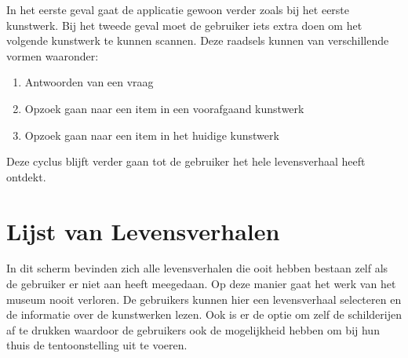 In het eerste geval gaat de applicatie gewoon verder zoals bij het eerste kunstwerk. Bij het tweede geval moet de gebruiker iets extra doen om het volgende kunstwerk te kunnen scannen. Deze raadsels kunnen van verschillende vormen waaronder:

\begin{enumerate}
    \item Antwoorden van een vraag
    \item Opzoek gaan naar een item in een voorafgaand kunstwerk
    \item Opzoek gaan naar een item in het huidige kunstwerk
\end{enumerate}

Deze cyclus blijft verder gaan tot de gebruiker het hele levensverhaal heeft ontdekt.

\section{Lijst van Levensverhalen}
In dit scherm bevinden zich alle levensverhalen die ooit hebben bestaan zelf als de gebruiker er niet aan heeft meegedaan. Op deze manier gaat het werk van het museum nooit verloren. De gebruikers kunnen hier een levensverhaal selecteren en de informatie over de kunstwerken lezen. Ook is er de optie om zelf de schilderijen af te drukken waardoor de gebruikers ook de mogelijkheid hebben om bij hun thuis de tentoonstelling uit te voeren.